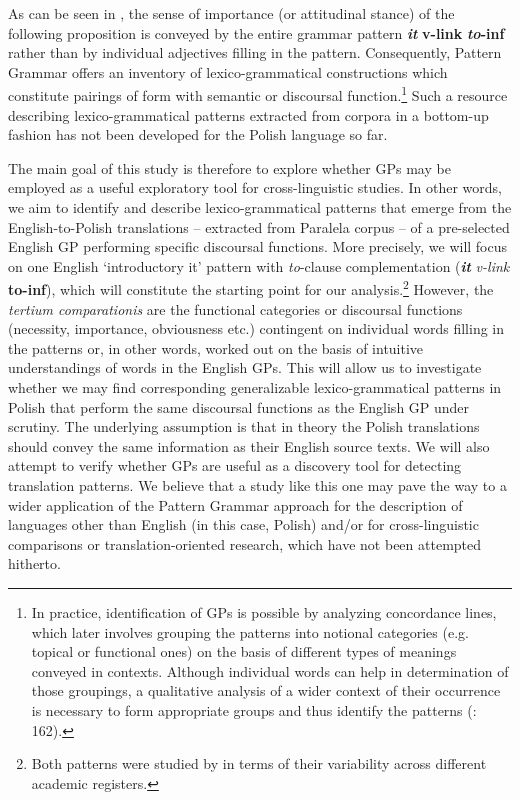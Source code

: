 \documentclass[output=paper]{langscibook}
\begin{document}
As can be seen in , the sense of importance (or attitudinal stance) of the following proposition is conveyed by the entire grammar pattern \textbf{\textit{it}} \textbf{v-link} \textbf{{\ADJ}} \textbf{\textit{to}}\textbf{{}-inf} rather than by individual adjectives filling in the pattern. Consequently, Pattern Grammar offers an inventory of lexico-grammatical constructions which constitute pairings of form with semantic or discoursal function.\footnote{\textrm{In practice, identification of GPs is possible by analyzing concordance lines, which later involves grouping the patterns into notional categories (e.g. topical or functional ones) on the basis of different types of meanings conveyed in contexts. Although individual words can help in determination of those groupings, a qualitative analysis of a wider context of their occurrence is necessary to form appropriate groups and thus identify the patterns (\citealt{HunstonFrancis2000}: 162).}} Such a resource describing lexico-grammatical patterns extracted from corpora in a bottom-up fashion has not been developed for the Polish language so far. 

The main goal of this study is therefore to explore whether GPs may be employed as a useful exploratory tool for cross-linguistic studies. In other words, we aim to identify and describe lexico-grammatical patterns that emerge from the English-to-Polish translations -- extracted from Paralela corpus \citep{Pęzik2016} -- of a pre-selected English GP performing specific discoursal functions. More precisely, we will focus on one English ‘introductory it’ pattern with \textit{to}{}-clause complementation (\textbf{\textit{it} }\textit{v-link}\textbf{ \textbf{{\ADJ}} \textbf{to-inf}}), which will constitute the starting point for our analysis.\footnote{\textrm{Both patterns were studied by \citet{Groom2005} in terms of their variability across different academic registers.}} However, the \textit{tertium comparationis} are the functional categories or discoursal functions (necessity, importance, obviousness etc.) contingent on individual words filling in the patterns or, in other words, worked out on the basis of intuitive understandings of words in the English GPs. This will allow us to investigate whether we may find corresponding generalizable lexico-grammatical patterns in Polish that perform the same discoursal functions as the English GP under scrutiny. The underlying assumption is that in theory the Polish translations should convey the same information as their English source texts. We will also attempt to verify whether GPs are useful as a discovery tool for detecting translation patterns. We believe that a study like this one may pave the way to a wider application of the Pattern Grammar approach for the description of languages other than English (in this case, Polish) and/or for cross-linguistic comparisons or translation-oriented research, which have not been attempted hitherto. 
\end{document}
